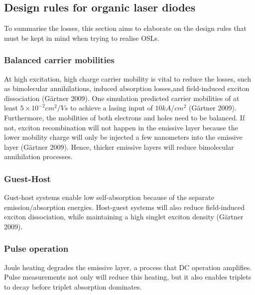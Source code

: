 \documentclass[
  letterpaper,
  DIV=11,
  numbers=noendperiod,
  oneside]{scrreprt}
\begin{document}
\hypertarget{design-rules-for-organic-laser-diodes}{%
\subsection{Design rules for organic laser
diodes}\label{design-rules-for-organic-laser-diodes}}

To summarise the losses, this section aims to elaborate on the design
rules that must be kept in mind when trying to realise OSLs.

\hypertarget{balanced-carrier-mobilities}{%
\subsubsection{Balanced carrier
mobilities}\label{balanced-carrier-mobilities}}

At high excitation, high charge carrier mobility is vital to reduce the
losses, such as bimolecular annihilations, induced absorption losses,and
field-induced exciton dissociation (Gärtner 2009). One simulation
predicted carrier mobilities of at least \(5\times10^{-2}cm^2/Vs\) to
achieve a lasing input of \(10kA/cm^2\) (Gärtner 2009). Furthermore, the
mobilities of both electrons and holes need to be balanced. If not,
exciton recombination will not happen in the emissive layer because the
lower mobility charge will only be injected a few nanometers into the
emissive layer (Gärtner 2009). Hence, thicker emissive layers will
reduce bimolecular annihilation processes.

\hypertarget{guest-host}{%
\subsubsection{Guest-Host}\label{guest-host}}

Gust-host systems enable low self-absorption because of the separate
emission/absorption energies. Host-guest systems will also reduce
field-induced exciton dissociation, while maintaining a high singlet
exciton density (Gärtner 2009).

\hypertarget{pulse-operation}{%
\subsubsection{Pulse operation}\label{pulse-operation}}

Joule heating degrades the emissive layer, a process that DC operation
amplifies. Pulse measurements not only will reduce this heating, but it
also enables triplets to decay before triplet absorption dominates.
\end{document}
